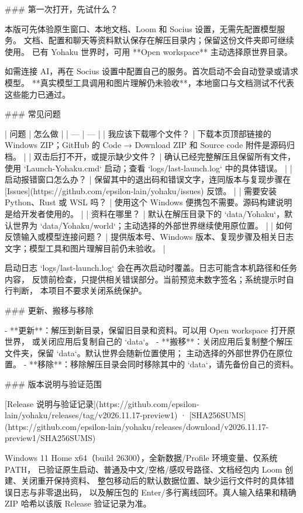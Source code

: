### 第一次打开，先试什么？

本版可先体验原生窗口、本地文档、Loom 和 Socius 设置，无需先配置模型服务。
文档、配置和聊天等资料默认保存在解压目录内；保留这份文件夹即可继续使用。
已有 Yohaku 世界时，可用 **Open workspace** 主动选择原世界目录。

如需连接 AI，再在 Socius 设置中配置自己的服务。首次启动不会自动登录或请求模型。
**真实模型工具调用和图片理解仍未验收**，本地窗口与文档测试不代表这些能力已通过。

### 常见问题

| 问题 | 怎么做 |
| --- | --- |
| 我应该下载哪个文件？ | 下载本页顶部链接的 Windows ZIP；GitHub 的 Code → Download ZIP 和 Source code 附件是源码归档。 |
| 双击后打不开，或提示缺少文件？ | 确认已经完整解压且保留所有文件，使用 `Launch-Yohaku.cmd` 启动；查看 `logs/last-launch.log` 中的具体错误。 |
| 启动报错窗口怎么办？ | 保留其中的退出码和错误文字，连同版本与复现步骤在 [Issues](https://github.com/epsilon-lain/yohaku/issues) 反馈。 |
| 需要安装 Python、Rust 或 WSL 吗？ | 使用这个 Windows 便携包不需要。源码构建说明是给开发者使用的。 |
| 资料在哪里？ | 默认在解压目录下的 `data/Yohaku`，默认世界为 `data/Yohaku/world`；主动选择的外部世界继续使用原位置。 |
| 如何反馈输入或模型连接问题？ | 提供版本号、Windows 版本、复现步骤及相关日志文字；模型工具和图片理解目前仍未验收。 |

启动日志 `logs/last-launch.log` 会在再次启动时覆盖。日志可能含本机路径和任务内容，
反馈前检查，只提供相关错误部分。当前预览未数字签名；系统提示时自行判断，
本项目不要求关闭系统保护。

### 更新、搬移与移除

- **更新**：解压到新目录，保留旧目录和资料。可以用 Open workspace 打开原世界，
  或关闭应用后复制自己的 `data`。
- **搬移**：关闭应用后复制整个解压文件夹，保留 `data`。默认世界会随新位置使用；
  主动选择的外部世界仍在原位置。
- **移除**：移除解压目录会同时移除其中的 `data`，请先备份自己的资料。

### 版本说明与验证范围

[Release 说明与验证记录](https://github.com/epsilon-lain/yohaku/releases/tag/v2026.11.17-preview1) · [SHA256SUMS](https://github.com/epsilon-lain/yohaku/releases/download/v2026.11.17-preview1/SHA256SUMS)

Windows 11 Home x64（build 26300），全新数据/Profile 环境变量、仅系统 PATH，
已验证原生启动、普通及中文/空格/感叹号路径、文档经包内 Loom 创建、关闭重开保持资料、
整包移动后的默认数据位置、缺少运行文件时的具体错误日志与非零退出码，
以及解压包的 Enter/多行离线回环。真人输入结果和精确 ZIP 哈希以该版 Release 验证记录为准。

